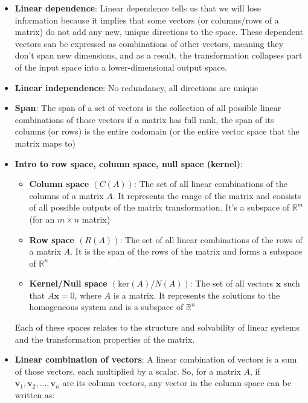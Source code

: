 \documentclass{report}
\begin{document}
    \pagebreak 
    \begin{itemize}
        \item \textbf{Linear dependence}: Linear dependence tells us that we will lose information because it implies that some vectors (or columns/rows of a matrix) do not add any new, unique directions to the space. These dependent vectors can be expressed as combinations of other vectors, meaning they don't span new dimensions, and as a result, the transformation collapses part of the input space into a lower-dimensional output space.
        \item \textbf{Linear independence}: No redundancy, all directions are unique
        \item \textbf{Span}: The span of a set of vectors is the collection of all possible linear combinations of those vectors
            \bigbreak \noindent 
            if a matrix has full rank, the span of its columns (or rows) is the entire codomain (or the entire vector space that the matrix maps to)
        \item \textbf{Intro to row space, column space, null space (kernel)}:
            \begin{itemize}
                \item \textbf{Column space $(C(A))$}:  The set of all linear combinations of the columns of a matrix $A$. It represents the range of the matrix and consists of all possible outputs of the matrix transformation. It's a subspace of $\mathbb{R}^{m}$ (for an $m\times n$ matrix)
                \item \textbf{Row space $(R(A))$}: The set of all linear combinations of the rows of a matrix $A$. It is the span of the rows of the matrix and forms a subspace of $\mathbb{R}^{n}$
                \item \textbf{Kernel/Null space $(\text{ker}(A)/N(A))$}: The set of all vectors $\mathbf{x}$ such that $A\mathbf{x}=0$, where $A$ is a matrix. It represents the solutions to the homogeneous system and is a subspace of $\mathbb{R}^{n}$
            \end{itemize}
            \bigbreak \noindent 
            Each of these spaces relates to the structure and solvability of linear systems and the transformation properties of the matrix.
    \item \textbf{Linear combination of vectors}: A linear combination of vectors is a sum of those vectors, each multiplied by a scalar. So, for a matrix $A$, if $\mathbf{v}_{1}, \mathbf{v}_{2}, ..., \mathbf{v}_{n}$ are its column vectors, any vector in the column space can be written as:

\end{itemize}
\end{document}
